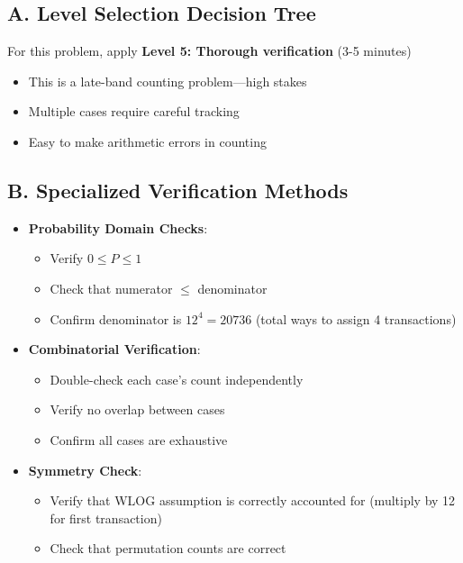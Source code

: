 \documentclass[]{article}
\begin{document}
\begin{verificationbox}
\subsection*{A. Level Selection Decision Tree}
For this problem, apply \textbf{Level 5: Thorough verification} (3-5 minutes)
\begin{itemize}
    \item This is a late-band counting problem---high stakes
    \item Multiple cases require careful tracking
    \item Easy to make arithmetic errors in counting
\end{itemize}

\subsection*{B. Specialized Verification Methods}
\begin{itemize}[leftmargin=*]
    \item \textbf{Probability Domain Checks}:
    \begin{itemize}
        \item Verify $0 \leq P \leq 1$
        \item Check that numerator $\leq$ denominator
        \item Confirm denominator is $12^4 = 20736$ (total ways to assign 4 transactions)
    \end{itemize}
    
    \item \textbf{Combinatorial Verification}:
    \begin{itemize}
        \item Double-check each case's count independently
        \item Verify no overlap between cases
        \item Confirm all cases are exhaustive
    \end{itemize}
    
    \item \textbf{Symmetry Check}:
    \begin{itemize}
        \item Verify that WLOG assumption is correctly accounted for (multiply by 12 for first transaction)
        \item Check that permutation counts are correct
    \end{itemize}
    

\end{itemize}
\end{verificationbox}
\end{document}
